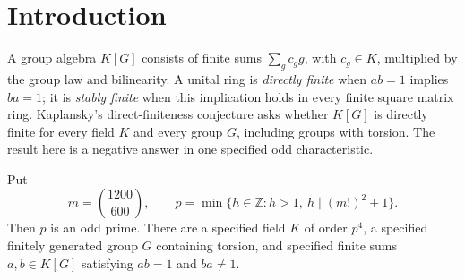 \section{Introduction}
\label{op:introduction}

A group algebra $K[G]$ consists of finite sums $\sum_g c_g g$, with
$c_g\in K$, multiplied by the group law and bilinearity. A unital ring is
\emph{directly finite} when $ab=1$ implies $ba=1$; it is \emph{stably
finite} when this implication holds in every finite square matrix ring.
Kaplansky's direct-finiteness conjecture asks whether $K[G]$ is directly
finite for every field $K$ and every group $G$, including groups with
torsion. The result here is a negative answer in one specified
odd characteristic.

\begin{theorem}\label{op:main}
Put
\[
 m=\binom{1200}{600},\qquad
 p=\min\{h\in\mathbb Z:h>1,\ h\mid(m!)^2+1\}.
\]
Then $p$ is an odd prime. There are a specified field $K$ of order $p^4$,
a specified finitely generated group $G$ containing torsion, and specified
finite sums $a,b\in K[G]$ satisfying $ab=1$ and $ba\ne1$.
\end{theorem}
